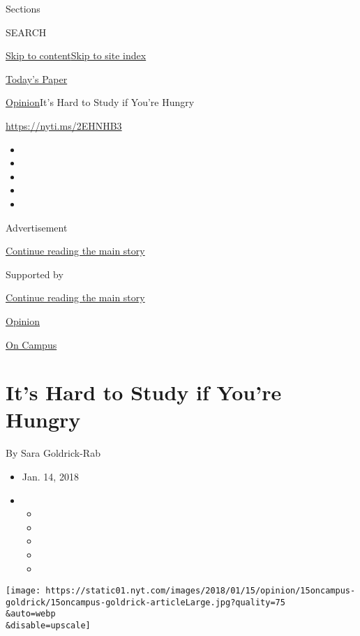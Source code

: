 Sections

SEARCH

\protect\hyperlink{site-content}{Skip to
content}\protect\hyperlink{site-index}{Skip to site index}

\href{https://myaccount.nytimes.com/auth/login?response_type=cookie\&client_id=vi}{}

\href{https://www.nytimes.com/section/todayspaper}{Today's Paper}

\href{/section/opinion}{Opinion}\textbar{}It's Hard to Study if You're
Hungry

\href{https://nyti.ms/2EHNHB3}{https://nyti.ms/2EHNHB3}

\begin{itemize}
\item
\item
\item
\item
\item
\end{itemize}

Advertisement

\protect\hyperlink{after-top}{Continue reading the main story}

Supported by

\protect\hyperlink{after-sponsor}{Continue reading the main story}

\href{/section/opinion}{Opinion}

\href{/column/on-campus}{On Campus}

\hypertarget{its-hard-to-study-if-youre-hungry}{%
\section{It's Hard to Study if You're
Hungry}\label{its-hard-to-study-if-youre-hungry}}

By Sara Goldrick-Rab

\begin{itemize}
\item
  Jan. 14, 2018
\item
  \begin{itemize}
  \item
  \item
  \item
  \item
  \item
  \end{itemize}
\end{itemize}

\texttt{[image: https://static01.nyt.com/images/2018/01/15/opinion/15oncampus-goldrick/15oncampus-goldrick-articleLarge.jpg?quality=75\\\&auto=webp\\\&disable=upscale]}


